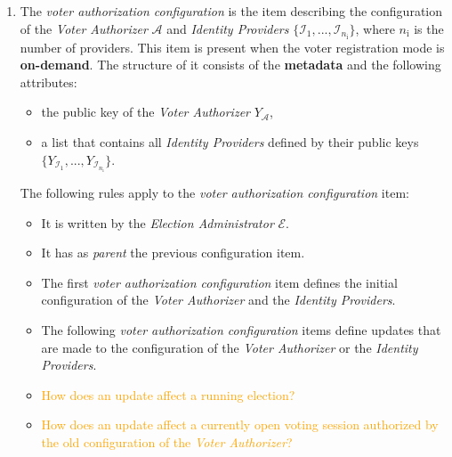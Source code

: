 \begin{enumerate}
    \item
        The \textit{voter authorization configuration} is the item describing the configuration of the \textit{Voter Authorizer} $\mathcal{A}$ and \textit{Identity Providers} $\{\mathcal{I}_1, ..., \mathcal{I}_{n_\mathrm{i}}\}$, where $n_\mathrm{i}$ is the number of providers. This item is present when the voter registration mode is \textbf{on-demand}. The structure of it consists of the \textbf{metadata} and the following attributes:
        \begin{itemize}
            \item the public key of the \textit{Voter Authorizer} $Y_\mathcal{A}$,
            \item a list that contains all \textit{Identity Providers} defined by their public keys $\{Y_{\mathcal{I}_1}, ..., Y_{\mathcal{I}_{n_\mathrm{i}}}\}$.
        \end{itemize}
        The following rules apply to the \textit{voter authorization configuration} item:
        \begin{itemize}
            \item It is written by the \textit{Election Administrator} $\mathcal{E}$.
            \item It has as \textit{parent} the previous configuration item.
            \item The first \textit{voter authorization configuration} item defines the initial configuration of the \textit{Voter Authorizer} and the \textit{Identity Providers}.
            \item The following \textit{voter authorization configuration} items define updates that are made to the configuration of the \textit{Voter Authorizer} or the \textit{Identity Providers}.
            \item \textcolor{orange}{How does an update affect a running election?}
            \item \textcolor{orange}{How does an update affect a currently open voting session authorized by the old configuration of the \textit{Voter Authorizer}?}
        \end{itemize}
\end{enumerate}

